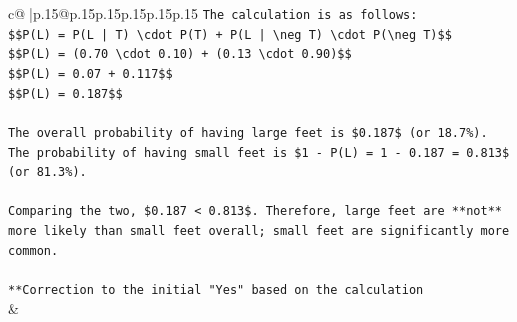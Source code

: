 \documentclass{article}
\begin{document}
{\begin{supertabular}{c@{$\;$}|p{.15\linewidth}@{}p{.15\linewidth}p{.15\linewidth}p{.15\linewidth}p{.15\linewidth}p{.15\linewidth}}
{{{\texttt{The calculation is as follows:} \\
\texttt{\$\$P(L) = P(L | T) \textbackslash{}cdot P(T) + P(L | \textbackslash{}neg T) \textbackslash{}cdot P(\textbackslash{}neg T)\$\$} \\
\texttt{\$\$P(L) = (0.70 \textbackslash{}cdot 0.10) + (0.13 \textbackslash{}cdot 0.90)\$\$} \\
\texttt{\$\$P(L) = 0.07 + 0.117\$\$} \\
\texttt{\$\$P(L) = 0.187\$\$} \\
\\ 
\texttt{The overall probability of having large feet is \$0.187\$ (or 18.7\%).} \\
\texttt{The probability of having small feet is \$1 {-} P(L) = 1 {-} 0.187 = 0.813\$ (or 81.3\%).} \\
\\ 
\texttt{Comparing the two, \$0.187 < 0.813\$. Therefore, large feet are **not** more likely than small feet overall; small feet are significantly more common.} \\
\\ 
\texttt{**Correction to the initial "Yes" based on the calculation} \\
            }
        }
    }
    & \\ \\


\end{supertabular}}
\end{document}
